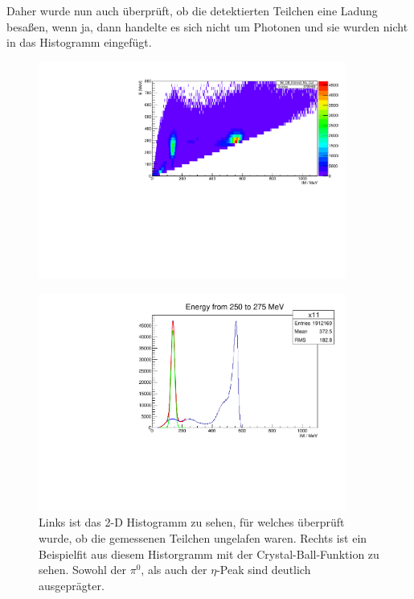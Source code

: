 \documentclass[a4paper,11pt,oneside,final,german,openbib,pdftex]{scrbook}
\begin{document}
{ Daher wurde nun auch \"uberpr\"uft, ob die detektierten Teilchen eine Ladung besa{\ss}en, wenn ja, dann handelte es sich nicht um Photonen und sie wurden nicht in das Histogramm eingef\"ugt. 
 
\begin{figure}[h!]
\centering
\begin{minipage}{0.45\textwidth}
	\centering
		\includegraphics[width=0.9\textwidth]{20172803IM_CB_Uncharged_Symmetric_No_Cut}
		
		\label{fig:Symmetric-Uncharged-Hist-No-Cut}
\end{minipage}
\hfill
\begin{minipage}{0.45\textwidth}
	\centering
	\includegraphics[width=0.9\textwidth]{20172803SymmetricUnchargedCBFFitExample}
\end{minipage}
\caption{Links ist das 2-D Histogramm zu sehen, f\"ur welches \"uberpr\"uft wurde, ob die gemessenen Teilchen ungelafen waren. Rechts ist ein Beispielfit aus diesem Historgramm mit der Crystal-Ball-Funktion zu sehen. Sowohl der $\pi^0$, als auch der $\eta$-Peak sind deutlich ausgepr\"agter.}
\end{figure}
 
}
\end{document}
